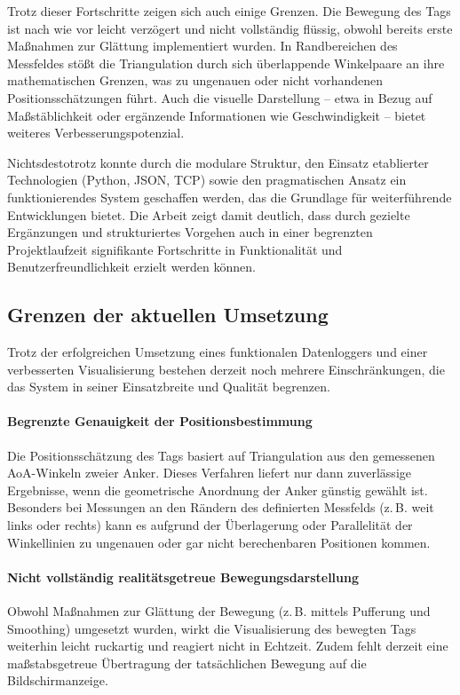 \documentclass[a4paper, 12pt]{article} %
\begin{document}
Trotz dieser Fortschritte zeigen sich auch einige Grenzen. Die Bewegung des Tags ist nach wie vor leicht verzögert und nicht vollständig flüssig, 
obwohl bereits erste Maßnahmen zur Glättung implementiert wurden. In Randbereichen des Messfeldes stößt die Triangulation durch sich überlappende 
Winkelpaare an ihre mathematischen Grenzen, was zu ungenauen oder nicht vorhandenen Positionsschätzungen führt. Auch die visuelle Darstellung – etwa in 
Bezug auf Maßstäblichkeit oder ergänzende Informationen wie Geschwindigkeit – bietet weiteres Verbesserungspotenzial.

Nichtsdestotrotz konnte durch die modulare Struktur, den Einsatz etablierter Technologien (Python, \ac{JSON}, \ac{TCP}) sowie den pragmatischen Ansatz ein 
funktionierendes System geschaffen werden, das die Grundlage für weiterführende Entwicklungen bietet. Die Arbeit zeigt damit deutlich, dass durch 
gezielte Ergänzungen und strukturiertes Vorgehen auch in einer begrenzten Projektlaufzeit signifikante Fortschritte in Funktionalität und 
Benutzerfreundlichkeit erzielt werden können.

\subsection{Grenzen der aktuellen Umsetzung}

Trotz der erfolgreichen Umsetzung eines funktionalen Datenloggers und einer verbesserten Visualisierung bestehen derzeit noch mehrere Einschränkungen, 
die das System in seiner Einsatzbreite und Qualität begrenzen.

\paragraph{Begrenzte Genauigkeit der Positionsbestimmung} 
Die Positionsschätzung des Tags basiert auf Triangulation aus den gemessenen \ac{AoA}-Winkeln zweier Anker. Dieses Verfahren liefert nur dann 
zuverlässige Ergebnisse, wenn die geometrische Anordnung der Anker günstig gewählt ist. Besonders bei Messungen an den Rändern des definierten 
Messfelds (z.\,B. weit links oder rechts) kann es aufgrund der Überlagerung oder Parallelität der Winkellinien zu ungenauen oder gar nicht 
berechenbaren Positionen kommen.

\paragraph{Nicht vollständig realitätsgetreue Bewegungsdarstellung}
Obwohl Maßnahmen zur Glättung der Bewegung (z.\,B. mittels Pufferung und Smoothing) umgesetzt wurden, wirkt die Visualisierung des bewegten 
Tags weiterhin leicht ruckartig und reagiert nicht in Echtzeit. Zudem fehlt derzeit eine maßstabsgetreue Übertragung der tatsächlichen Bewegung 
auf die Bildschirmanzeige.
\end{document}
